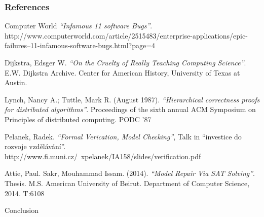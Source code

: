 \documentclass{bredelebeamer}
\begin{document}
\begin{frame}
\frametitle{References}

\begin{thebibliography}{9}

  \small{Computer World
  \emph{``Infamous 11 software Bugs''}.
  http://www.computerworld.com/article/2515483/enterprise-applications/epic-failures--11-infamous-software-bugs.html?page=4
  }

  \small{Dijkstra, Edsger W. \emph{``On the Cruelty of Really Teaching Computing Science''}. E.W. Dijkstra Archive. Center for American History, University of Texas at Austin.
  }
  
  \small{Lynch, Nancy A.; Tuttle, Mark R. (August 1987). \emph{``Hierarchical correctness proofs for distributed algorithms''}. Proceedings of the sixth annual ACM Symposium on Principles of distributed computing. PODC '87
  }
  
  \small{Pelanek, Radek. \emph{``Formal Verication, Model Checking''}, Talk in ``investice do rozvoje vzdělávání''. http://www.fi.muni.cz/~xpelanek/IA158/slides/verification.pdf
  
  }
  
  \small{Attie, Paul. Sakr, Mouhammad Issam. (2014). \emph{``Model Repair Via SAT Solving''}. Thesis. M.S. American University of Beirut. Department of Computer Science, 2014. T:6108
  }
  
\end{thebibliography}

\end{frame}

\begin{frame}{Conclusion}


\end{frame}
\end{document}
